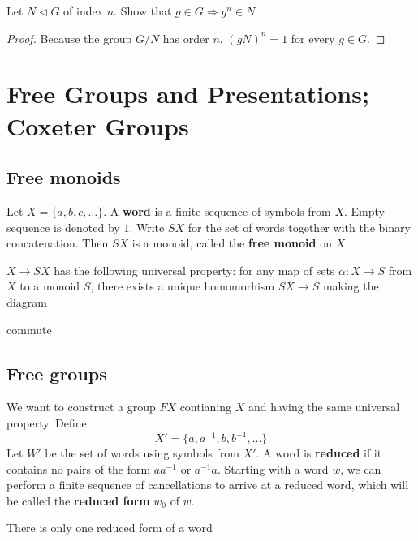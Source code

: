 \documentclass[11pt]{article}
\begin{document}
\begin{exercise}
\label{ex1.5}
Let \(N\lhd G\) of index \(n\). Show that \(g\in G\Rightarrow g^n\in N\)
\end{exercise}

\begin{proof}
Because the group \(G/N\) has order \(n\), \((gN)^n=1\) for every \(g\in G\).
\end{proof}
\section{Free Groups and Presentations; Coxeter Groups}
\label{sec:orgb77595c}
\subsection{Free monoids}
\label{sec:orgc7e4de3}
Let \(X=\{a,b,c,\dots\}\). A \textbf{word} is a finite sequence of symbols from \(X\). Empty sequence is
denoted by \(1\). Write \(SX\) for the set of words together with the binary concatenation.
Then \(SX\) is a monoid, called the \textbf{free monoid} on \(X\)

\(X\to SX\) has the following universal property: for any map of sets \(\alpha:X\to S\) from \(X\) to a
monoid \(S\), there exists a unique homomorhism \(SX\to S\) making the diagram
\begin{center}\end{center}
commute
\subsection{Free groups}
\label{sec:org0758685}
We want to construct a group \(FX\) contianing \(X\) and having the same universal property.
Define
\begin{equation*}
X'=\{a,a^{-1},b,b^{-1},\dots\}
\end{equation*}
Let \(W'\) be the set of words using symbols from \(X'\). A word is \textbf{reduced} if it contains no
pairs of the form \(aa^{-1}\) or \(a^{-1}a\). Starting with a word \(w\), we can perform a
finite sequence of cancellations to arrive at a reduced word, which will be called the \textbf{reduced
form} \(w_0\) of \(w\).

\begin{proposition}[]
There is only one reduced form of a word
\end{proposition}
\end{document}
